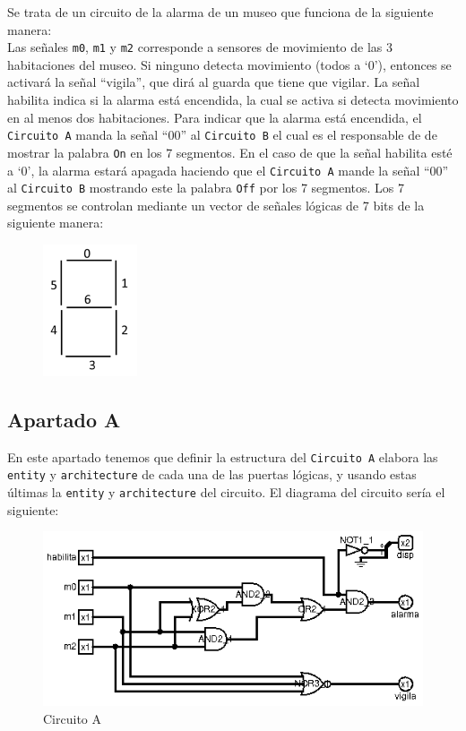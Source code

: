 \documentclass[a4paper,titlepage]{article}
\begin{document}
			Se trata de un circuito de la alarma de un museo que funciona de la siguiente manera:\\
			Las señales \texttt{m0}, \texttt{m1} y \texttt{m2} corresponde a sensores de movimiento de
			las 3 habitaciones del museo. Si ninguno detecta movimiento (todos a `0'), entonces se activará
			la señal ``vigila'', que dirá al guarda que tiene que vigilar. La señal habilita indica si la alarma
			está encendida, la cual se activa si detecta movimiento en al menos dos habitaciones. Para indicar que
			la alarma está encendida, el \texttt{Circuito A} manda la señal ``00'' al \texttt{Circuito B} el cual 
			es el responsable de de mostrar la palabra \texttt{On} en los 7 segmentos. En el caso de que la señal habilita 
			esté a `0', la alarma estará apagada haciendo que el \texttt{Circuito A} mande la señal ``00'' al
			\texttt{Circuito B} mostrando este la palabra \texttt{Off} por los 7 segmentos. Los 7 segmentos se controlan
			mediante un vector de señales lógicas de 7 bits de la siguiente manera:
			\begin{figure}[h]
				\centering
				\includegraphics{img/7seg.png}
			\end{figure}
			\subsection{Apartado A}
				En este apartado tenemos que definir la estructura del \texttt{Circuito A} elabora las \texttt{entity} 
				y \texttt{architecture} de cada una de las puertas lógicas, y usando estas últimas la \texttt{entity}
				y \texttt{architecture} del circuito. El diagrama del circuito sería el siguiente:\\
				\begin{figure}[h]
					\centering
					\includegraphics[width=\textwidth]{../Ejercicio2/circuitos/circuito_a.png}
					\caption{Circuito A}
					\label{f:ej2_a}
				\end{figure}
\end{document}
